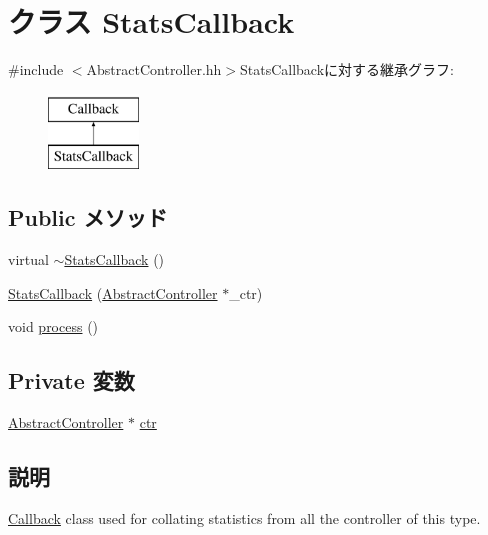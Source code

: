 \hypertarget{classAbstractController_1_1StatsCallback}{
\section{クラス StatsCallback}
\label{classAbstractController_1_1StatsCallback}
}


{\ttfamily \#include $<$AbstractController.hh$>$}StatsCallbackに対する継承グラフ:\begin{figure}[H]
\begin{center}
\leavevmode
\includegraphics[height=2cm]{classAbstractController_1_1StatsCallback}
\end{center}
\end{figure}
\subsection*{Public メソッド}
\begin{DoxyCompactItemize}
\item 
virtual \hyperlink{classAbstractController_1_1StatsCallback_af912e043410ed023ceb7b6eacf42a794}{$\sim$StatsCallback} ()
\item 
\hyperlink{classAbstractController_1_1StatsCallback_a21a0491ed8c247edae7783371356ec5d}{StatsCallback} (\hyperlink{classAbstractController}{AbstractController} $\ast$\_\-ctr)
\item 
void \hyperlink{classAbstractController_1_1StatsCallback_a2e9c5136d19b1a95fc427e0852deab5c}{process} ()
\end{DoxyCompactItemize}
\subsection*{Private 変数}
\begin{DoxyCompactItemize}
\item 
\hyperlink{classAbstractController}{AbstractController} $\ast$ \hyperlink{classAbstractController_1_1StatsCallback_a888182eae55b1785e132b97c932bc5d4}{ctr}
\end{DoxyCompactItemize}


\subsection{説明}
\hyperlink{classCallback}{Callback} class used for collating statistics from all the controller of this type. 

